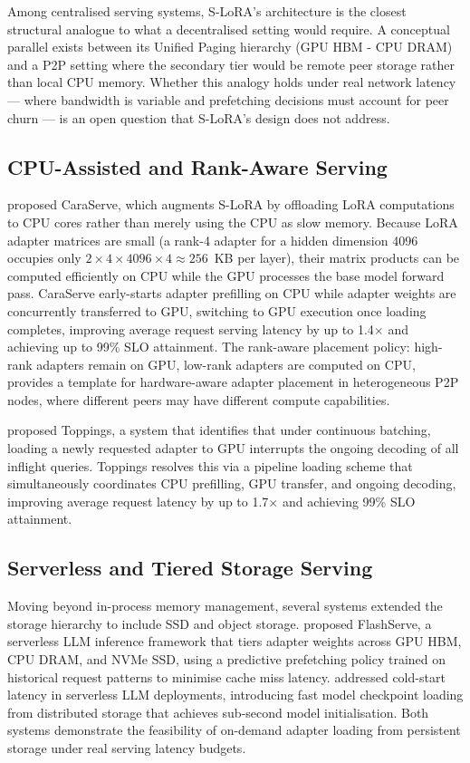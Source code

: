 Among centralised serving systems, S-LoRA's architecture is the closest structural analogue to what a decentralised setting would require. A conceptual parallel exists between its Unified Paging hierarchy (GPU HBM - CPU DRAM) and a P2P setting where the secondary tier would be remote peer storage rather than local CPU memory. Whether this analogy holds under real network latency — where bandwidth is variable and prefetching decisions must account for peer churn — is an open question that S-LoRA's design does not address.

\subsection{CPU-Assisted and Rank-Aware Serving}
\label{sec:inference_systems:cpu}

\citet{Li2024CaraServe} proposed CaraServe, which augments S-LoRA by offloading LoRA
computations to CPU cores rather than merely using the CPU as slow memory. Because LoRA
adapter matrices are small (a rank-4 adapter for a hidden dimension 4096 occupies only
$2 \times 4 \times 4096 \times 4 \approx 256$~KB per layer), their matrix products can
be computed efficiently on CPU while the GPU processes the base model forward pass.
CaraServe early-starts adapter prefilling on CPU while adapter weights are concurrently
transferred to GPU, switching to GPU execution once loading completes, improving
average request serving latency by up to 1.4$\times$ and achieving up to 99\% SLO
attainment. The rank-aware placement policy: high-rank adapters remain on GPU,
low-rank adapters are computed on CPU, provides a template for hardware-aware adapter
placement in heterogeneous P2P nodes, where different peers may have different compute
capabilities.

\citet{LiToppings2025} proposed Toppings, a system that identifies that under continuous
batching, loading a newly requested adapter to GPU interrupts the ongoing decoding of all
inflight queries. Toppings resolves this via a pipeline loading scheme that simultaneously
coordinates CPU prefilling, GPU transfer, and ongoing decoding, improving average request
latency by up to 1.7$\times$ and achieving 99\% SLO attainment.

\subsection{Serverless and Tiered Storage Serving}
\label{sec:inference_systems:serverless}

Moving beyond in-process memory management, several systems extended the storage
hierarchy to include SSD and object storage. \citet{ChenFlashServe2025} proposed
FlashServe, a serverless LLM inference framework that tiers adapter weights across GPU
HBM, CPU DRAM, and NVMe SSD, using a predictive prefetching policy trained on
historical request patterns to minimise cache miss latency. \citet{FuServerlessLLM2024}
addressed cold-start latency in serverless LLM deployments, introducing fast model
checkpoint loading from distributed storage that achieves sub-second model initialisation.
Both systems demonstrate the feasibility of on-demand adapter loading from persistent
storage under real serving latency budgets.

